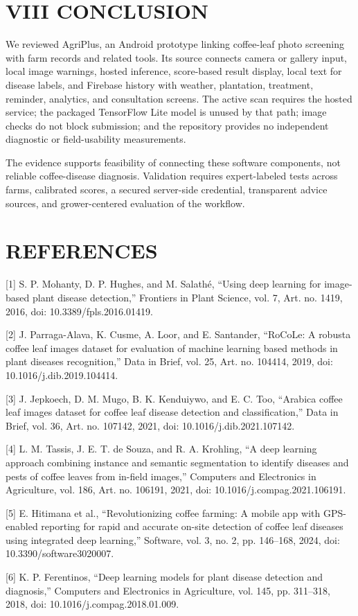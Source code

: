 \documentclass[conference]{IEEEtran}
\begin{document}
\section*{VIII CONCLUSION}

We reviewed AgriPlus, an Android prototype linking coffee-leaf photo screening with farm records and related tools. Its source connects camera or gallery input, local image warnings, hosted inference, score-based result display, local text for disease labels, and Firebase history with weather, plantation, treatment, reminder, analytics, and consultation screens. The active scan requires the hosted service; the packaged TensorFlow Lite model is unused by that path; image checks do not block submission; and the repository provides no independent diagnostic or field-usability measurements.

The evidence supports feasibility of connecting these software components, not reliable coffee-disease diagnosis. Validation requires expert-labeled tests across farms, calibrated scores, a secured server-side credential, transparent advice sources, and grower-centered evaluation of the workflow.

\section*{REFERENCES}

[1] S. P. Mohanty, D. P. Hughes, and M. Salathé, ``Using deep learning for image-based plant disease detection,'' Frontiers in Plant Science, vol. 7, Art. no. 1419, 2016, doi: 10.3389/fpls.2016.01419.

[2] J. Parraga-Alava, K. Cusme, A. Loor, and E. Santander, ``RoCoLe: A robusta coffee leaf images dataset for evaluation of machine learning based methods in plant diseases recognition,'' Data in Brief, vol. 25, Art. no. 104414, 2019, doi: 10.1016/j.dib.2019.104414.

[3] J. Jepkoech, D. M. Mugo, B. K. Kenduiywo, and E. C. Too, ``Arabica coffee leaf images dataset for coffee leaf disease detection and classification,'' Data in Brief, vol. 36, Art. no. 107142, 2021, doi: 10.1016/j.dib.2021.107142.

[4] L. M. Tassis, J. E. T. de Souza, and R. A. Krohling, ``A deep learning approach combining instance and semantic segmentation to identify diseases and pests of coffee leaves from in-field images,'' Computers and Electronics in Agriculture, vol. 186, Art. no. 106191, 2021, doi: 10.1016/j.compag.2021.106191.

[5] E. Hitimana et al., ``Revolutionizing coffee farming: A mobile app with GPS-enabled reporting for rapid and accurate on-site detection of coffee leaf diseases using integrated deep learning,'' Software, vol. 3, no. 2, pp. 146--168, 2024, doi: 10.3390/software3020007.

[6] K. P. Ferentinos, ``Deep learning models for plant disease detection and diagnosis,'' Computers and Electronics in Agriculture, vol. 145, pp. 311--318, 2018, doi: 10.1016/j.compag.2018.01.009.
\end{document}
